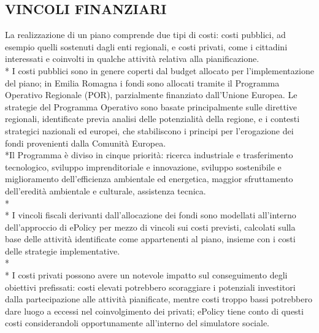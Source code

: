 \documentclass[12pt,a4paper,openright,twoside]{report}
\begin{document}
\subsection[VINCOLI FINANZIARI]{\nohyphens{VINCOLI FINANZIARI}}
La realizzazione di un piano comprende due tipi di costi: costi pubblici, ad esempio quelli sostenuti dagli enti regionali, e costi privati, come i cittadini interessati e coinvolti in qualche attività relativa alla pianificazione.\\*
I costi pubblici sono in genere coperti dal budget allocato per l'implementazione del piano;  in Emilia Romagna i fondi sono allocati tramite il Programma Operativo Regionale \cite{POR} (POR), parzialmente finanziato dall'Unione Europea. Le strategie del Programma Operativo sono basate principalmente sulle direttive regionali, identificate previa analisi delle potenzialità della regione, e i contesti strategici nazionali ed europei, che stabiliscono i principi per l'erogazione dei fondi provenienti dalla Comunità Europea.\\*Il Programma è diviso in cinque priorità: ricerca industriale e trasferimento tecnologico, sviluppo imprenditoriale e innovazione, sviluppo sostenibile e miglioramento dell'efficienza ambientale ed energetica, maggior sfruttamento dell'eredità ambientale e culturale, assistenza tecnica.\\*\\*
I vincoli fiscali derivanti dall'allocazione dei fondi sono modellati all'interno dell'approccio di ePolicy per mezzo di vincoli sui costi previsti, calcolati sulla base delle attività identificate come appartenenti al piano, insieme con i costi delle strategie implementative. \\*\\*
I costi privati possono avere un notevole impatto sul conseguimento degli obiettivi prefissati: costi elevati potrebbero scoraggiare i potenziali investitori dalla partecipazione alle attività pianificate, mentre costi troppo bassi potrebbero dare luogo a eccessi nel coinvolgimento dei privati; ePolicy tiene conto di questi costi considerandoli opportunamente all'interno del simulatore sociale.
 
\end{document}
